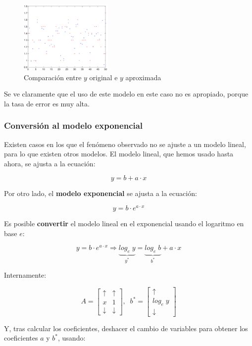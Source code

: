 \documentclass[11pt]{scrartcl}
\begin{document}
\begin{figure}[h!]
  \centering
  \includegraphics[width=0.4\textwidth]{img/modelolineal_iris}
  \caption{Comparación entre $y$ original e $y$ aproximada}
\end{figure}

Se ve claramente que el uso de este modelo en este caso no es apropiado, porque
la tasa de error es muy alta.

\subsubsection{Conversión al modelo exponencial}

Existen casos en los que el fenómeno observado no se ajuste a un modelo lineal,
para lo que existen otros modelos. El modelo lineal, que hemos usado hasta
ahora, se ajusta a la ecuación:

\[
y = b + a \cdot x
\]

Por otro lado, el \textbf{modelo exponencial} se ajusta a la ecuación:

\[
y = b \cdot e ^{a\cdot x}
\]

Es posible \textbf{convertir} el modelo lineal en el exponencial usando el
logaritmo en base $e$:

\[
y = b \cdot e^{a \cdot x} \Rightarrow \underbrace{log_e \; y}_{y^*} = \underbrace{log_e \; b}_{b^*} + a \cdot x
\]

Internamente:

\[
A =
\begin{bmatrix}
\uparrow & \uparrow \\
x & 1 \\
\downarrow & \downarrow  
\end{bmatrix}, 
\;\; b^* =
\begin{bmatrix}
\uparrow \\
log_e \; y \\
\downarrow  
\end{bmatrix}
\]

Y, tras calcular los coeficientes, deshacer el cambio de
variables para obtener los coeficientes $a$ y $b^*$, usando:
\end{document}
